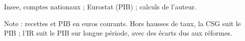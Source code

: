 Insee, comptes nationaux ; Eurostat (PIB) ; calculs de l'auteur.\par Note : recettes et PIB en euros courants. Hors hausses de taux, la CSG suit le PIB ; l'IR suit le PIB sur longue période, avec des écarts dus aux réformes.
